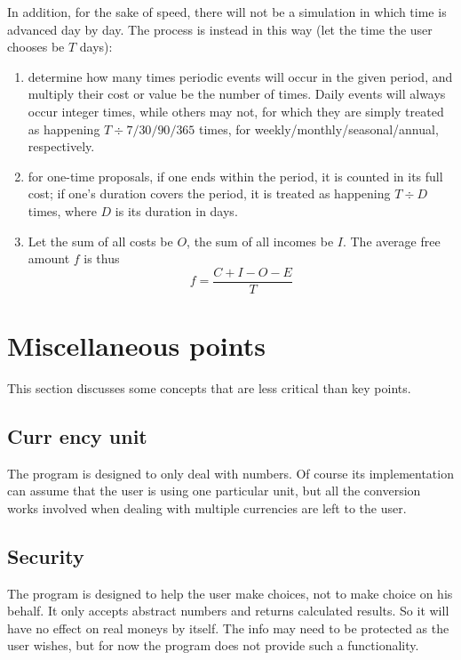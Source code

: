 In addition, for the sake of speed, there will not be a simulation in which time is advanced day by day. The process is instead in this way (let the time the user chooses be $T$ days):
\begin{enumerate}
	\item determine how many times periodic events will occur in the given period, and multiply their cost or value be the number of times. Daily events will always occur integer times, while others may not, for which they are simply treated as happening $T \div 7/30/90/365$ times, for weekly/monthly/seasonal/annual, respectively.
	\item for one-time proposals, if one ends within the period, it is counted in its full cost; if one's duration covers the period, it is treated as happening $T \div D$ times, where $D$ is its duration in days.
	\item Let the sum of all costs be $O$, the sum of all incomes be $I$. The average free amount $f$ is thus
	\[
	f = \frac{C + I - O - E}{T}
	\]
\end{enumerate}

\section{Miscellaneous points}
This section discusses some concepts that are less critical than key points.

\subsection{Curr																															ency unit}
The program is designed to only deal with numbers. Of course its implementation can assume that the user is using one particular unit, but all the conversion works involved when dealing with multiple currencies are left to the user.

\subsection{Security}
The program is designed to help the user make choices, not to make choice on his behalf. It only accepts abstract numbers and returns calculated results. So it will have no effect on real moneys by itself. The info may need to be protected as the user wishes, but for now the program does not provide such a functionality.